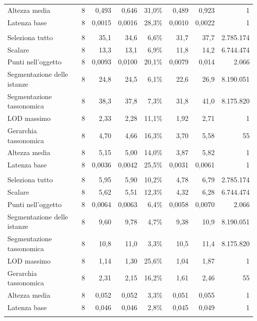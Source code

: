 \begin{small}
\begin{longtable}{lrrrrrr r}
\quad Altezza media & 8 & 0,493 & 0,646 & 31,0\% & 0,489 & 0,923 & 1 \\
\quad Latenza base & 8 & 0,0015 & 0,0016 & 28,3\% & 0,0010 & 0,0022 & 1 \\
\addlinespace
\multicolumn{8}{l}{\textbf{qEndpoint}}\\
\quad Seleziona tutto & 8 & 35,1 & 34,6 & 6,6\% & 31,7 & 37,7 & 2.785.174 \\
\quad Scalare & 8 & 13,3 & 13,1 & 6,9\% & 11,8 & 14,2 & 6.744.474 \\
\quad Punti nell'oggetto & 8 & 0,0093 & 0,0100 & 20,1\% & 0,0079 & 0,014 & 2.066 \\
\quad Segmentazione delle istanze & 8 & 24,8 & 24,5 & 6,1\% & 22,6 & 26,9 & 8.190.051 \\
\quad Segmentazione tassonomica & 8 & 38,3 & 37,8 & 7,3\% & 31,8 & 41,0 & 8.175.820 \\
\quad LOD massimo & 8 & 2,33 & 2,28 & 11,1\% & 1,92 & 2,71 & 1 \\
\quad Gerarchia tassonomica & 8 & 4,70 & 4,66 & 16,3\% & 3,70 & 5,58 & 55 \\
\quad Altezza media & 8 & 5,15 & 5,00 & 14,0\% & 3,87 & 5,82 & 1 \\
\quad Latenza base & 8 & 0,0036 & 0,0042 & 25,5\% & 0,0031 & 0,0061 & 1 \\
\addlinespace
\multicolumn{8}{l}{\textbf{QLever}}\\
\quad Seleziona tutto & 8 & 5,95 & 5,90 & 10,2\% & 4,78 & 6,79 & 2.785.174 \\
\quad Scalare & 8 & 5,62 & 5,51 & 12,3\% & 4,32 & 6,28 & 6.744.474 \\
\quad Punti nell'oggetto & 8 & 0,0064 & 0,0063 & 6,4\% & 0,0058 & 0,0070 & 2.066 \\
\quad Segmentazione delle istanze & 8 & 9,60 & 9,78 & 4,7\% & 9,38 & 10,9 & 8.190.051 \\
\quad Segmentazione tassonomica & 8 & 10,8 & 11,0 & 3,3\% & 10,5 & 11,4 & 8.175.820 \\
\quad LOD massimo & 8 & 1,14 & 1,30 & 25,6\% & 1,04 & 1,87 & 1 \\
\quad Gerarchia tassonomica & 8 & 2,31 & 2,15 & 16,2\% & 1,61 & 2,46 & 55 \\
\quad Altezza media & 8 & 0,052 & 0,052 & 3,3\% & 0,051 & 0,055 & 1 \\
\quad Latenza base & 8 & 0,046 & 0,046 & 2,8\% & 0,045 & 0,049 & 1 \\
\addlinespace
\multicolumn{8}{l}{\textbf{RDFLib}}\\

\end{longtable}
\end{small}
